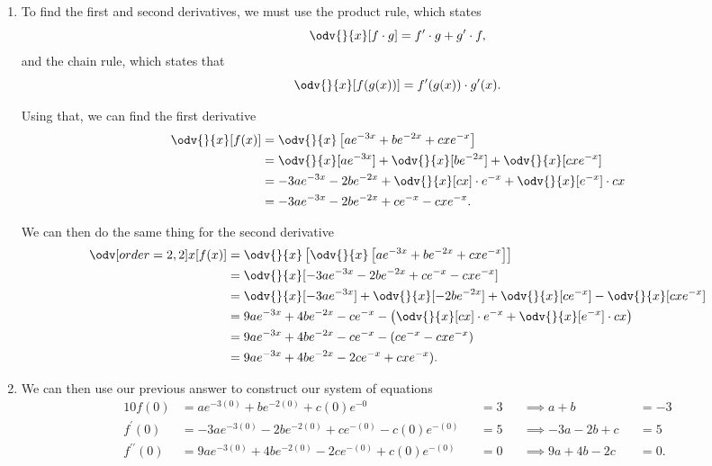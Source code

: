 \begin{solution}
  \label{sol:dealing_with_derivatives}

  \begin{enumerate}
    \label{enum:dealing_with_derivatives_sol}

    \item To find the first and second derivatives, we must use the product
      rule, which states
      \[%
        \odv{}{x}[f \cdot g] = f^{\prime} \cdot g + g^{\prime} \cdot f
      ,\]%
      and the chain rule, which states that
      \[%
        \odv{}{x}[f(g(x))] = f^{\prime}(g(x)) \cdot g^{\prime}(x)
      .\]%

      Using that, we can find the first derivative
      \begin{align*}
        \odv{}{x}[f(x)] &= \odv{}{x}\left[ae^{-3x} + be^{-2x} + cxe^{-x}\right] \\
                        &= \odv{}{x}[ae^{-3x}] + \odv{}{x}[be^{-2x}] + \odv{}{x}[cxe^{-x}] \\
                        &= -3ae^{-3x} - 2be^{-2x} + \odv{}{x}[cx] \cdot e^{-x} + \odv{}{x}[e^{-x}] \cdot cx \\
                        &= -3ae^{-3x} - 2be^{-2x} + ce^{-x} - cxe^{-x}
      .\end{align*}

      We can then do the same thing for the second derivative
      \begin{align*}
        \odv[order={2,2}]{}{x}[f(x)] &= \odv{}{x}\left[\odv{}{x}\left[ae^{-3x} + be^{-2x} + cxe^{-x}\right]\right] \\
                                     &= \odv{}{x}[-3ae^{-3x} - 2be^{-2x} + ce^{-x} - cxe^{-x}] \\
                                     &= \odv{}{x}[-3ae^{-3x}] + \odv{}{x}[-2be^{-2x}] + \odv{}{x}[ce^{-x}] - \odv{}{x}[cxe^{-x}] \\
                                     &= 9ae^{-3x} + 4be^{-2x} - ce^{-x} - \left(\odv{}{x}[cx] \cdot e^{-x} + \odv{}{x}[e^{-x}] \cdot cx\right) \\
                                     &= 9ae^{-3x} + 4be^{-2x} - ce^{-x} - (ce^{-x} - cxe^{-x}) \\
                                     &= 9ae^{-3x} + 4be^{-2x} - 2ce^{-x} + cxe^{-x})
      .\end{align*}

    \item We can then use our previous answer to construct our system of
      equations
      \begin{alignat*}{10}
        f(0) &= ae^{-3(0)} + be^{-2(0)} + c(0)e^{-0} &&= 3 &&\implies a + b &&= -3 \\
        f^{\prime}(0) &= -3ae^{-3(0)} - 2be^{-2(0)} + ce^{-(0)} - c(0)e^{-(0)} &&= 5 &&\implies -3a - 2b + c &&= 5 \\
        f^{\prime\prime}(0) &= 9ae^{-3(0)} + 4be^{-2(0)} - 2ce^{-(0)} + c(0)e^{-(0)} &&= 0 &&\implies 9a + 4b - 2c &&= 0
      .\end{alignat*}


\end{enumerate}
\end{solution}
